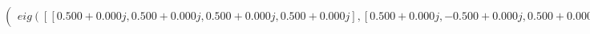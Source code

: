 \documentclass[border=1em]{standalone}
\begin{document}
$
\left(
\begin{array}{cccc}
e
i
g
(
[
[
0
.
5
0
0
+
0
.
0
0
0
j
,
 
0
.
5
0
0
+
0
.
0
0
0
j
,
 
0
.
5
0
0
+
0
.
0
0
0
j
,
 
0
.
5
0
0
+
0
.
0
0
0
j
]
,
[
0
.
5
0
0
+
0
.
0
0
0
j
,
 
-
0
.
5
0
0
+
0
.
0
0
0
j
,
 
0
.
5
0
0
+
0
.
0
0
0
j
,
 
-
0
.
5
0
0
+
0
.
0
0
0
j
]
,
[
0
.
5
0
0
+
0
.
0
0
0
j
,
 
0
.
5
0
0
+
0
.
0
0
0
j
,
 
-
0
.
5
0
0
+
0
.
0
0
0
j
,
 
-
0
.
5
0
0
+
0
.
0
0
0
j
]
,
[
0
.
5
0
0
+
0
.
0
0
0
j
,
 
-
0
.
5
0
0
+
0
.
0
0
0
j
,
 
-
0
.
5
0
0
+
0
.
0
0
0
j
,
 
0
.
5
0
0
+
0
.
0
0
0
j
]
]
)
\end{array}
\right)
$
\end{document}
